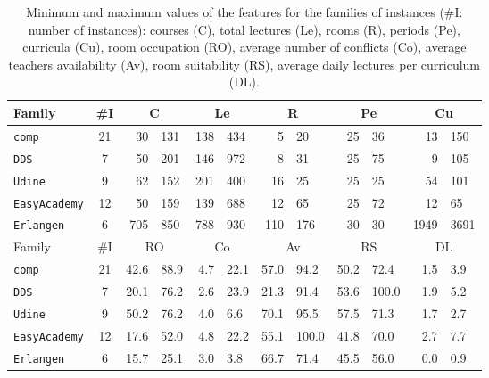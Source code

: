 \documentclass[authoryear,12pt]{article}
\begin{document}
{
\renewcommand{\arraystretch}{1.1}
\renewcommand{\tabcolsep}{4pt}
\begin{table}
\caption{Minimum and maximum values of the features for the families of instances (\#I: number of instances): courses (C), total lectures (Le), rooms (R), periods (Pe), curricula (Cu), room occupation (RO), average number of conflicts (Co), average teachers availability (Av), room suitability (RS), average daily lectures per curriculum (DL). }
  \centering
\begin{footnotesize}
  \begin{tabular}{lc*{5}{r@{ -- }l}}
  \toprule
    Family & \#I & \multicolumn{2}{c}{C} & \multicolumn{2}{c}{Le} & \multicolumn{2}{c}{R} & \multicolumn{2}{c}{Pe}  & \multicolumn{2}{c}{Cu} \\
    \midrule
\texttt{comp} & 21 & 30 & 131 & 138 & 434 & 5 & 20 & 25 & 36 & 13 & 150 \\
\texttt{DDS} & 7 & 50 & 201 & 146 & 972 & 8 & 31 & 25 & 75 & 9 & 105 \\
\texttt{Udine} & 9 & 62 & 152 & 201 & 400 & 16 & 25 & 25 & 25 & 54 & 101 \\
\texttt{EasyAcademy} & 12 & 50 & 159 & 139 & 688 & 12 & 65 & 25 & 72 & 12 & 65 \\
\texttt{Erlangen}  &  6  &  705 & 850 & 788 & 930 & 110 & 176 & 30 & 30 & 1949 & 3691\\

\midrule
Family & \#I & \multicolumn{2}{c}{RO} & \multicolumn{2}{c}{Co}& \multicolumn{2}{c}{Av}& \multicolumn{2}{c}{RS}& \multicolumn{2}{c}{DL}  \\
\midrule
\texttt{comp} & 21 & 42.6 & 88.9 & 4.7 & 22.1 & 57.0 & 94.2 & 50.2 & 72.4 & 1.5 & 3.9 \\
\texttt{DDS} & 7 & 20.1 & 76.2 & 2.6 & 23.9 & 21.3 & 91.4 & 53.6 & 100.0 & 1.9 & 5.2\\
\texttt{Udine} & 9 & 50.2 & 76.2 & 4.0 & 6.6 & 70.1 & 95.5 & 57.5 & 71.3 & 1.7 & 2.7\\
\texttt{EasyAcademy} & 12 & 17.6 & 52.0 & 4.8 & 22.2 & 55.1 & 100.0 & 41.8 & 70.0 & 2.7 & 7.7\\
\texttt{Erlangen}  &  6  & 15.7 & 25.1 & 3.0 & 3.8 & 66.7 & 71.4 & 45.5 & 56.0 & 0.0 & 0.9\\

\bottomrule
  \end{tabular}
\end{footnotesize}
  \label{tab:features}
\end{table}
}

\setlength{\tabcolsep}{6pt}
\end{document}
